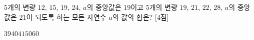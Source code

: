 $5$개의 변량 $12$, $15$, $19$, $24$, $a$의 중앙값은 $19$이고 $5$개의 변량 $19$, $21$, $22$, $28$, $a$의 중앙값은 $21$이 되도록 하는 모든 자연수 $a$의 값의 합은? \mbox{[4점]}
\begin{choices32}{$39$}{$40$}{$41$}{$50$}{$60$}\end{choices32}

